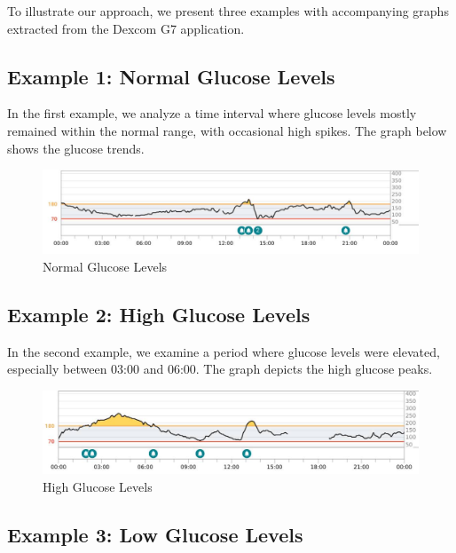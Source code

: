 \documentclass{article}
\begin{document}
To illustrate our approach, we present three examples with accompanying graphs extracted from the Dexcom G7 application.

\subsection{Example 1: Normal Glucose Levels}

In the first example, we analyze a time interval where glucose levels mostly remained within the normal range, with occasional high spikes. The graph below shows the glucose trends.

\begin{figure}[h]
    \centering
    \includegraphics[width=1.0\textwidth]{Images/normal_glucose.jpeg}
    \caption{Normal Glucose Levels}
    \label{fig:normal_glucose}
\end{figure}

\subsection{Example 2: High Glucose Levels}

In the second example, we examine a period where glucose levels were elevated, especially between 03:00 and 06:00. The graph depicts the high glucose peaks.

\begin{figure}[h]
    \centering
    \includegraphics[width=1.0\textwidth]{Images/high_glucose.jpeg}
    \caption{High Glucose Levels}
    \label{fig:high_glucose}
\end{figure}



\subsection{Example 3: Low Glucose Levels}
\end{document}
